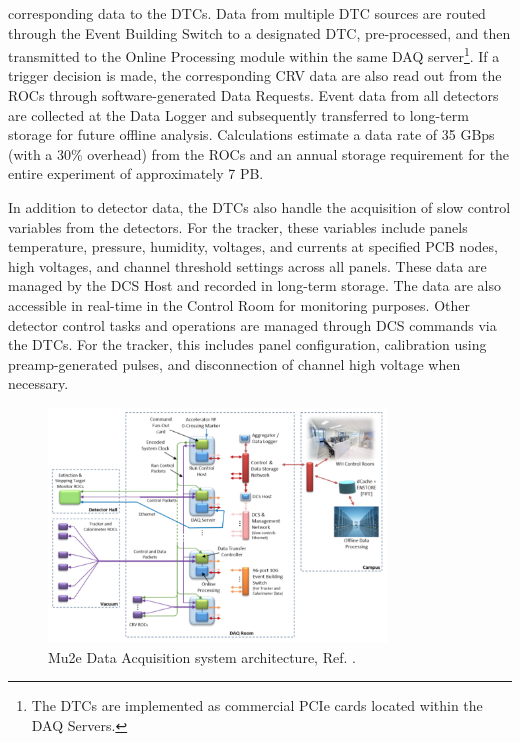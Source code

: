 corresponding data to the DTCs. Data from multiple DTC sources are routed 
through the Event Building Switch to a designated DTC, pre-processed, and 
then transmitted to the Online Processing module within the same DAQ 
server\footnote{The DTCs are implemented as commercial PCIe cards located 
within the DAQ Servers.}. If a trigger decision is made, the corresponding 
CRV data are also read out from the ROCs through software-generated Data 
Requests. Event data from all detectors are collected at the Data Logger 
and subsequently transferred to long-term storage for future offline 
analysis. Calculations estimate a data rate of 35 GBps (with a 30\% overhead) 
from the ROCs and an annual storage requirement for the entire experiment of 
approximately 7 PB. 

In addition to detector data, the DTCs also handle the acquisition of 
slow control variables from the detectors. For the tracker, these variables 
include panels temperature, pressure, humidity, voltages, and currents at 
specified PCB nodes, high voltages, and channel threshold settings across 
all panels. These data are managed by the DCS Host and recorded in long-term 
storage. The data are also accessible in real-time in the Control Room for 
monitoring purposes. Other detector control tasks and operations are managed 
through DCS commands via the DTCs. For the tracker, this includes panel 
configuration, calibration using preamp-generated pulses, and disconnection 
of channel high voltage when necessary. 

\begin{figure}[!h]
    \centering
    \includegraphics[width =0.8\textwidth]{figures/png/Screenshot_20240206_144803.png}
    \caption[The Mu2e Data Acquisition system architecture.]{Mu2e Data Acquisition system architecture, Ref. \cite{GIOIOSA2023167732}.}
    \label{fig:linktodaq}
    \end{figure}



